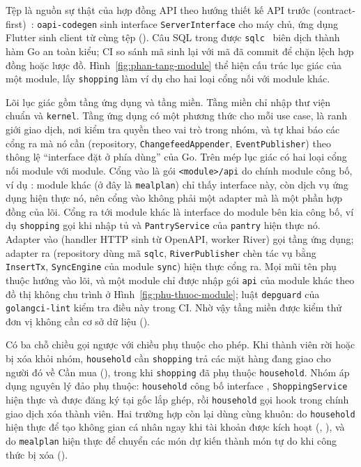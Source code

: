 Tệp  là nguồn sự thật của hợp đồng API theo hướng thiết kế API trước (contract-first)~\cite{openapi}: \texttt{oapi-codegen} sinh interface \texttt{ServerInterface} cho máy chủ, ứng dụng Flutter sinh client từ cùng tệp (). Câu SQL trong  được \texttt{sqlc}~\cite{sqlc} biên dịch thành hàm Go an toàn kiểu; CI so sánh mã sinh lại với mã đã commit để chặn lệch hợp đồng hoặc lược đồ. Hình~\ref{fig:phan-tang-module} thể hiện cấu trúc lục giác của một module, lấy \texttt{shopping} làm ví dụ cho hai loại cổng nối với module khác.


Lõi lục giác gồm tầng ứng dụng và tầng miền. Tầng miền chỉ nhập thư viện chuẩn và \texttt{kernel}. Tầng ứng dụng có một phương thức cho mỗi use case, là ranh giới giao dịch, nơi kiểm tra quyền theo vai trò trong nhóm, và tự khai báo các cổng ra mà nó cần (repository, \texttt{ChangefeedAppender}, \texttt{EventPublisher}) theo thông lệ “interface đặt ở phía dùng” của Go. Trên mép lục giác có hai loại cổng nối module với module. Cổng vào là gói \texttt{<module>/api} do chính module công bố, ví dụ : module khác (ở đây là \texttt{mealplan}) chỉ thấy interface này, còn dịch vụ ứng dụng hiện thực nó, nên cổng vào không phải một adapter mà là một phần hợp đồng của lõi. Cổng ra tới module khác là interface do module bên kia công bố, ví dụ \texttt{shopping} gọi  khi nhập tủ và \texttt{PantryService} của \texttt{pantry} hiện thực nó. Adapter vào (handler HTTP sinh từ OpenAPI, worker River) gọi tầng ứng dụng; adapter ra (repository dùng mã \texttt{sqlc}, \texttt{RiverPublisher} chèn tác vụ bằng \texttt{InsertTx}, \texttt{SyncEngine} của module \texttt{sync}) hiện thực cổng ra. Mọi mũi tên phụ thuộc hướng vào lõi, và một module chỉ được nhập gói \texttt{api} của module khác theo đồ thị không chu trình ở Hình~\ref{fig:phu-thuoc-module}; luật \texttt{depguard} của \texttt{golangci-lint} kiểm tra điều này trong CI. Nhờ vậy tầng miền được kiểm thử đơn vị không cần cơ sở dữ liệu ().

Có ba chỗ chiều gọi ngược với chiều phụ thuộc cho phép. Khi thành viên rời hoặc bị xóa khỏi nhóm, \texttt{household} cần \texttt{shopping} trả các mặt hàng đang giao cho người đó về Cần mua (), trong khi \texttt{shopping} đã phụ thuộc \texttt{household}. Nhóm áp dụng nguyên lý đảo phụ thuộc: \texttt{household} công bố interface , \texttt{ShoppingService} hiện thực và được đăng ký tại gốc lắp ghép, rồi \texttt{household} gọi hook trong chính giao dịch xóa thành viên. Hai trường hợp còn lại dùng cùng khuôn:  do \texttt{household} hiện thực để tạo không gian cá nhân ngay khi tài khoản được kích hoạt (, ), và  do \texttt{mealplan} hiện thực để chuyển các món dự kiến thành món tự do khi công thức bị xóa ().

